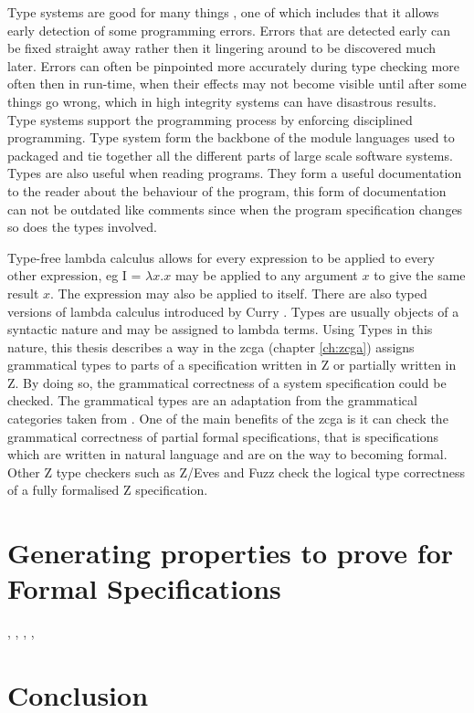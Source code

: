 Type systems are good for many things \cite{pierce}, one of which includes that it allows early detection of some programming errors. Errors that are detected early can be fixed straight away rather then it lingering around to be discovered much later. Errors can often be pinpointed more accurately during type checking more often then in run-time, when their effects may not become visible until after some things go wrong, which in high integrity systems can have disastrous results. Type systems support the programming process by enforcing disciplined programming. Type system form the backbone of the module languages used to packaged and tie together all the different parts of large scale software systems. Types are also useful when reading programs. They form a useful documentation to the reader about the behaviour of the program, this form of documentation can not be outdated like comments since when the program specification changes so does the types involved.

Type-free lambda calculus \cite{bar93} allows for every expression to be applied to every other expression, eg I = $\lambda x.x$ may be applied to any argument $x$ to give the same result $x$. The expression may also be applied to itself. There are also typed versions of lambda calculus introduced by Curry \cite{cu34}. Types are usually objects of a syntactic nature and may be assigned to lambda terms. Using Types in this nature, this thesis describes a way in the \gls{zcga} (chapter \ref{ch:zcga}) assigns grammatical types to parts of a specification written in Z or partially written in Z. By doing so, the grammatical correctness of a system specification could be checked. The grammatical types are an adaptation from the grammatical categories taken from \cite{wtt}. One of the main benefits of the \gls{zcga} is it can check the grammatical correctness of partial formal specifications, that is specifications which are written in natural language and are on the way to becoming formal. Other Z type checkers such as Z/Eves \cite{Saaltink99thez/eves} and Fuzz \cite{spiveyfuzz} check the logical type correctness of a fully formalised Z specification.

\section{Generating properties to prove for Formal Specifications}

\cite{DBLP:conf/icsea/WenMZ06}, \cite{DBLP:conf/sefm/FraserB07}, \cite{stepney1998tale}, \cite{Woodcock:1996:UZS:235337}, \cite{woodcock2004tutorial}

\section{Conclusion}
